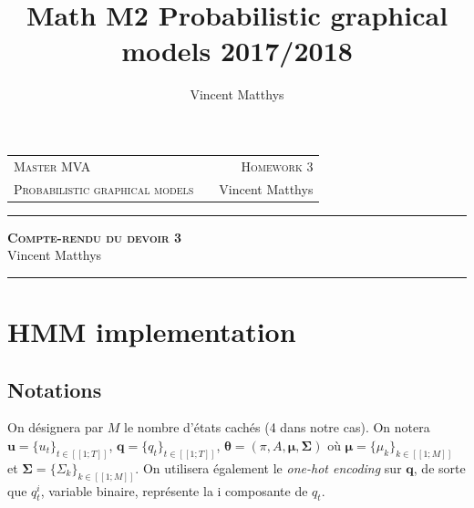 \documentclass[12pt,a4paper,onecolumn]{article}
\title{Math M2 Probabilistic graphical models 2017/2018}
\author{Vincent Matthys}
\begin{document}
\begin{tabularx}{0.8\textwidth}{@{} l X r @{} }
	{\textsc{Master MVA}}                   &  & \textsc{Homework 3} \\
	\textsc{Probabilistic graphical models} &  & {Vincent Matthys}   \\
\end{tabularx}
\vspace{1.5cm}
\begin{center}
	\rule[11pt]{5cm}{0.5pt}

	\textbf{\LARGE \textsc{Compte-rendu du devoir 3}}
	\vspace{0.5cm}\\
	Vincent Matthys\\
	\rule{5cm}{0.5pt}
	\vspace{1.5cm}
\end{center}

\section{HMM implementation}



\setcounter{subsection}{-1}
\subsection{Notations}

On désignera par \(M\) le nombre d'états cachés (4 dans notre cas).
On notera \(\bm{u} = \{u_t\}_{t \in [\![1;T]\!]}\), \(\bm{q} = \{q_t\}_{t \in [\![1;T]\!]}\), \(\bm{\theta} = \left(\pi, A, \bm{\mu}, \bm{\Sigma}\right)\) où \(\bm{\mu} = \{\mu_k\}_{k \in [\![1;M]\!]}\) et \(\bm{\Sigma} = \{\Sigma_k\}_{k \in [\![1;M]\!]}\).
On utilisera également le \textit{one-hot encoding} sur \(\bm{q}\), de sorte que \(q_t^i\), variable binaire, représente la i composante de \(q_t\).
\end{document}
